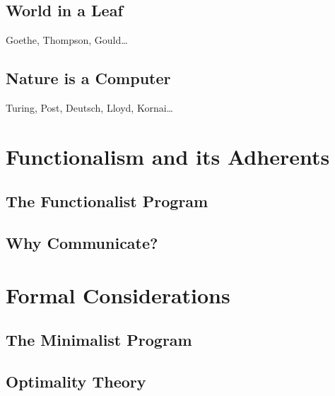 \documentclass[11pt]{book}%
\theoremstyle{plain}
\numberwithin{equation}{section}
\theoremstyle{definition}
\newtheorem{phrase string}{Phrase String}
\begin{document}
\chapter{World in a Leaf}%
Goethe, Thompson, Gould\ldots


\chapter{Nature is a Computer}%
Turing, Post, Deutsch, Lloyd, Kornai\ldots







\part{Functionalism and its Adherents}%
\chapter{The Functionalist Program}%


\chapter{Why Communicate?}%









\part{Formal Considerations}%
\chapter{The Minimalist Program}\label{chap:mp}%


\chapter{Optimality Theory}%
\end{document}
